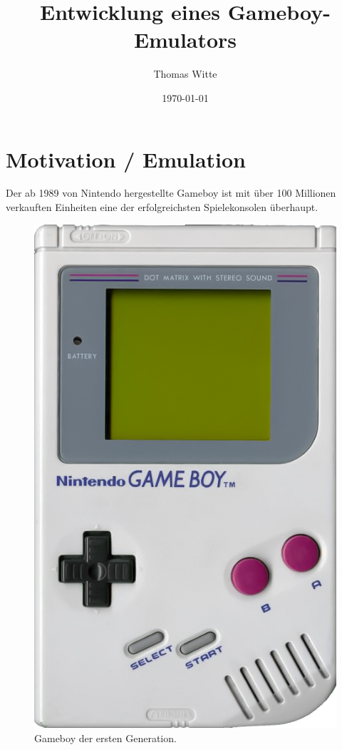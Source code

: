 \documentclass[a4paper]{scrartcl}
\title{Entwicklung eines Gameboy-Emulators}
\author{Thomas Witte}
\date{\today}
\begin{document}
\maketitle

\section{Motivation / Emulation}

Der ab 1989 von Nintendo hergestellte Gameboy ist mit über 100 Millionen verkauften Einheiten eine der erfolgreichsten Spielekonsolen überhaupt.

\begin{figure}
\centering
\includegraphics[width=0.9\linewidth]{img/Gameboy.jpg}
\caption{Gameboy der ersten Generation.}
\label{img:gameboy}
\end{figure}
\end{document}

